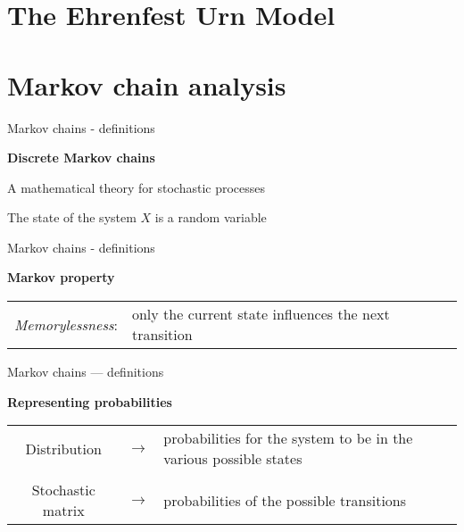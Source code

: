 \documentclass[usenames,dvipsnames]{beamer}
\begin{document}
  \label{model}
  \section{The Ehrenfest Urn Model}
  

  \label{markov}
  \section{Markov chain analysis}
  \begin{frame}{Markov chains - definitions}
    \begin{center}
      \Large{\textbf{Discrete Markov chains}}
    \end{center}
    A mathematical theory for stochastic processes

    The state of the system $X$ is a random variable

    \bigskip
    \begin{figure}
      
    \end{figure}
  \end{frame}

  \begin{frame}{Markov chains - definitions}
    \begin{center}
      \Large{\textbf{Markov property}}
    \end{center}
    \begin{table}
      \begin{tabularx}{\textwidth}{c >{\raggedright}X}
        \alert{\emph{Memorylessness}}: & only the current state influences the next transition \tabularnewline
      \end{tabularx}
    \end{table}
  \end{frame}

  \begin{frame}{Markov chains --- definitions}
    \begin{center}
      \Large \textbf{Representing probabilities}
    \end{center}

    \renewcommand{\tabularxcolumn}{m}
    \begin{table}
      \begin{tabularx}{0.9\textwidth}{c c >{\raggedright}X}
        \alert{Distribution} & $\rightarrow$ & probabilities for the system to be in the various possible states \tabularnewline
        & & \tabularnewline
        \alert{Stochastic matrix} & $\rightarrow$ & probabilities of the possible transitions
      \end{tabularx}

    \end{table}
    
  \end{frame}
\end{document}
